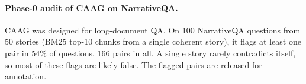 \paragraph{Phase-0 audit of CAAG on NarrativeQA.}
CAAG was designed for long-document QA. On 100 NarrativeQA \citep{kocisky2018narrativeqa} questions from 50 stories
(BM25 top-10 chunks from a single coherent story), it flags at least one pair in 54\% of questions, 166 pairs in all.
A single story rarely contradicts itself, so most of these flags are likely false. The flagged pairs are released for annotation.
